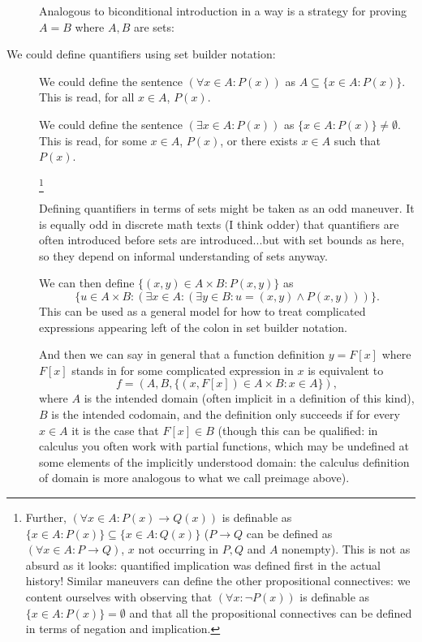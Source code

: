 \documentclass[12pt]{article}
\begin{document}
\begin{description}
\begin{description}
\end{description}

Analogous to biconditional introduction in a way is a strategy for proving $A=B$ where $A,B$ are sets:  


\item[We could define quantifiers using set builder notation:]

We could define the sentence $(\forall x \in A:P(x))$ as $A \subseteq \{x \in A:P(x)\}$.  This is read, for all $x \in A$, $P(x)$.

We could define the sentence $(\exists x \in A:P(x))$ as $\{x \in A:P(x)\} \neq \emptyset$.  This is read, for some $x \in A$, $P(x)$, or there exists $x \in A$ such that $P(x)$.

\footnote{Further, $(\forall x \in A:P(x) \rightarrow Q(x))$ is definable as $\{x \in A:P(x)\} \subseteq \{x \in A:Q(x)\}$
($P \rightarrow Q$ can be defined as $(\forall x \in A:P \rightarrow Q)$, $x$ not occurring in $P,Q$ and $A$ nonempty).  This is not as  absurd as it looks:  quantified implication was defined first in the actual history!  Similar maneuvers can define the other propositional connectives:  we content ourselves with observing that $(\forall x:\neg P(x))$ is definable as $\{x \in A:P(x)\} = \emptyset$ and that all the propositional connectives can be defined in terms of negation and implication.}

Defining quantifiers in terms of sets might be taken as an odd maneuver.  It is equally odd in discrete math texts (I think odder) that quantifiers are often introduced before sets are introduced...but with set bounds as here, so they depend on informal understanding of sets anyway.

We can then define $\{(x,y) \in A \times B:P(x,y)\}$ as $$\{u \in A \times B:(\exists x \in A:(\exists y \in B:u=(x,y) \wedge P(x,y)))\}.$$ This can be used as a general model for how to treat complicated expressions appearing left of the colon in set builder notation.

And then we can say in general that a function definition $y = F[x]$ where $F[x]$ stands in for some complicated expression in $x$ is equivalent to $$f=(A,B,\{(x,F[x]) \in A \times B:x\in A\}),$$  where $A$ is the intended domain (often implicit in a definition of this kind), $B$ is the intended codomain, and the definition only succeeds if for every $x \in A$ it is the case that $F[x] \in B$ (though this can be qualified:  in calculus you often work with partial functions, which may be undefined at some elements of the implicitly understood domain:  the calculus definition of domain is more analogous to what we call preimage above).


\end{description}
\end{document}
